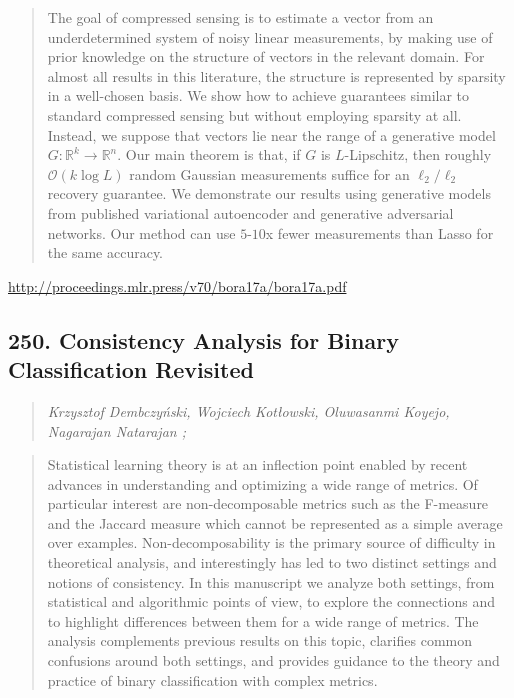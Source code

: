\documentclass{article}
\begin{document}
\begin{quote}
    The goal of compressed sensing is to estimate a vector from an underdetermined system of noisy linear measurements, by making use of prior knowledge on the structure of vectors in the relevant domain. For almost all results in this literature, the structure is represented by sparsity in a well-chosen basis. We show how to achieve guarantees similar to standard compressed sensing but without employing sparsity at all. Instead, we suppose that vectors lie near the range of a generative model $G: \mathbb{R}^k \to \mathbb{R}^n$. Our main theorem is that, if $G$ is $L$-Lipschitz, then roughly $\mathcal{O}(k \log L)$ random Gaussian measurements suffice for an $\ell_2/\ell_2$ recovery guarantee. We demonstrate our results using generative models from published variational autoencoder and generative adversarial networks. Our method can use $5$-$10$x fewer measurements than Lasso for the same accuracy.  \end{quote}

\href{http://proceedings.mlr.press/v70/bora17a/bora17a.pdf}{http://proceedings.mlr.press/v70/bora17a/bora17a.pdf}

\subsection{250. Consistency Analysis for Binary Classification Revisited}

\begin{quote}
\footnotesize{\textit{Krzysztof Dembczyński, Wojciech Kotłowski, Oluwasanmi Koyejo, Nagarajan Natarajan ;}}
\end{quote}

\begin{quote}
    Statistical learning theory is at an inflection point enabled by recent advances in understanding and optimizing a wide range of metrics. Of particular interest are non-decomposable metrics such as the F-measure and the Jaccard measure which cannot be represented as a simple average over examples. Non-decomposability is the primary source of difficulty in theoretical analysis, and interestingly has led to two distinct settings and notions of consistency. In this manuscript we analyze both settings, from statistical and algorithmic points of view, to explore the connections and to highlight differences between them for a wide range of metrics. The analysis complements previous results on this topic, clarifies common confusions around both settings, and provides guidance to the theory and practice of binary classification with complex metrics.  \end{quote}
\end{document}

